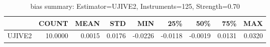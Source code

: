 \begin{table}[ht]
\centering
\caption{bias summary: Estimator=UJIVE2, Instruments=125, Strength=0.70}
\begin{tabular}{lrrrrrrrr}
\toprule
 & COUNT & MEAN & STD & MIN & 25\% & 50\% & 75\% & MAX \\
\midrule
UJIVE2 & 10.0000 & 0.0015 & 0.0176 & -0.0226 & -0.0118 & -0.0019 & 0.0131 & 0.0320 \\
\bottomrule
\end{tabular}
\end{table}
